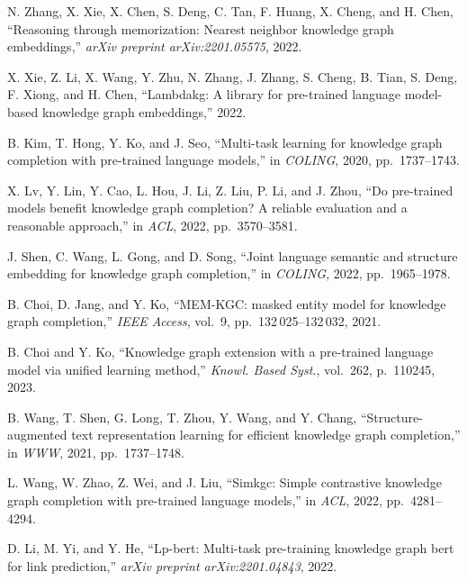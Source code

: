 \begin{enumerate}[leftmargin=2em,label={[\arabic*]}]
\item N. Zhang, X. Xie, X. Chen, S. Deng, C. Tan, F. Huang, X. Cheng, and H. Chen, ``Reasoning through memorization: Nearest neighbor knowledge graph embeddings,'' \textit{arXiv preprint arXiv:2201.05575}, 2022.

\item X. Xie, Z. Li, X. Wang, Y. Zhu, N. Zhang, J. Zhang, S. Cheng, B. Tian, S. Deng, F. Xiong, and H. Chen, ``Lambdakg: A library for pre-trained language model-based knowledge graph embeddings,'' 2022.

\item B. Kim, T. Hong, Y. Ko, and J. Seo, ``Multi-task learning for knowledge graph completion with pre-trained language models,'' in \textit{COLING}, 2020, pp.~1737--1743.

\item X. Lv, Y. Lin, Y. Cao, L. Hou, J. Li, Z. Liu, P. Li, and J. Zhou, ``Do pre-trained models benefit knowledge graph completion? A reliable evaluation and a reasonable approach,'' in \textit{ACL}, 2022, pp.~3570--3581.

\item J. Shen, C. Wang, L. Gong, and D. Song, ``Joint language semantic and structure embedding for knowledge graph completion,'' in \textit{COLING}, 2022, pp.~1965--1978.

\item B. Choi, D. Jang, and Y. Ko, ``MEM-KGC: masked entity model for knowledge graph completion,'' \textit{IEEE Access}, vol.~9, pp.~132\,025--132\,032, 2021.

\item B. Choi and Y. Ko, ``Knowledge graph extension with a pre-trained language model via unified learning method,'' \textit{Knowl. Based Syst.}, vol.~262, p.~110245, 2023.

\item B. Wang, T. Shen, G. Long, T. Zhou, Y. Wang, and Y. Chang, ``Structure-augmented text representation learning for efficient knowledge graph completion,'' in \textit{WWW}, 2021, pp.~1737--1748.

\item L. Wang, W. Zhao, Z. Wei, and J. Liu, ``Simkgc: Simple contrastive knowledge graph completion with pre-trained language models,'' in \textit{ACL}, 2022, pp.~4281--4294.

\item D. Li, M. Yi, and Y. He, ``Lp-bert: Multi-task pre-training knowledge graph bert for link prediction,'' \textit{arXiv preprint arXiv:2201.04843}, 2022.


\end{enumerate}
